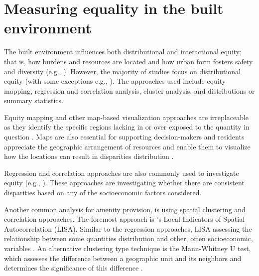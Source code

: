 \documentclass[final,3p,times,onecolumn,sort&compress]{elsarticle}
\begin{document}
\section{Measuring equality in the built environment}
The built environment influences both distributional and interactional equity; that is, how burdens and resources are located and how urban form fosters safety and diversity (e.g., \cite{Jacobs1961-po, Low2013-yx}). 
However, the majority of studies focus on distributional equity (with some exceptions e.g., \cite{Williams2020-greenspace}).
The approaches used include equity mapping, regression and correlation analysis, cluster analysis, and distributions or summary statistics.

Equity mapping and other map-based visualization approaches are irreplaceable as they identify the specific regions lacking in or over exposed to the quantity in question \citep{Talen1998-fl, Wolch2005-wz}. 
Maps are also essential for supporting decision-makers and residents appreciate the geographic arrangement of resources and enable them to visualize how the locations can result in disparities distribution \citep{Talen1998-fl}.

Regression and correlation approaches are also commonly used to investigate equity (e.g., \cite{Schwarz2015-fs, Nesbitt2019-sk, Kim2016-mc, Williams2020-greenspace, Apparicio2007-di}).
These approaches are investigating whether there are consistent disparities based on any of the socioeconomic factors considered.

Another common analysis for amenity provision, is using spatial clustering and correlation approaches.
The foremost approach is \cite{Anselin1995-fh}'s Local Indicators of Spatial Autocorrelation (LISA). 
Similar to the regression approaches, LISA assessing the relationship between some quantities distribution and other, often socioeconomic, variables \citep{Talen1997-gl, Smoyer-Tomic2004-eh,Garcia2020-xt}.
An alternative clustering type technique is the Mann-Whitney U test, which assesses the difference between a geographic unit and its neighbors and determines the significance of this difference \citep{Nicholls2001-pf}.
\end{document}
